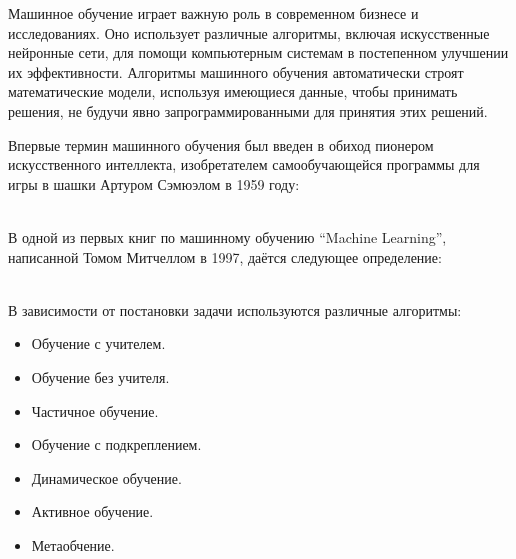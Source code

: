 




Машинное обучение играет важную роль в современном бизнесе и исследованиях. Оно использует различные алгоритмы, включая искусственные нейронные сети, для помощи компьютерным системам в постепенном улучшении их эффективности. Алгоритмы машинного обучения автоматически строят математические модели, используя имеющиеся данные, чтобы принимать решения, не будучи явно запрограммированными для принятия этих решений. \\


Впервые термин машинного обучения был введен в обиход пионером искусственного интеллекта, изобретателем самообучающейся программы для игры в шашки Артуром Сэмюэлом в 1959 году: \\

\

В одной из первых книг по машинному обучению ``Machine Learning'', написанной Томом Митчеллом в 1997, даётся следующее определение: \\

\

В зависимости от постановки задачи используются различные алгоритмы: \\

\begin{itemize}
  \item Обучение с учителем. 
  \item Обучение без учителя.
  \item Частичное обучение.
  \item Обучение с подкреплением.
  \item Динамическое обучение.
  \item Активное обучение.
  \item Метаобчение.
\end{itemize}
\

